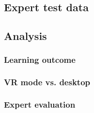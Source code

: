 \subsection{Expert test data}






\subsection{Analysis}

\subsubsection{Learning outcome}

\subsubsection{VR mode vs. desktop}

\subsubsection{Expert evaluation}


\cleardoublepage